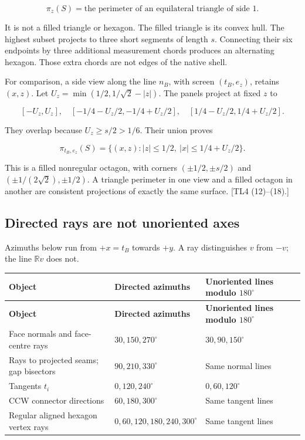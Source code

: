 \documentclass[11pt,a4paper]{article}
\begin{document}
\[
\pi_z(S)=\text{the perimeter of an equilateral triangle of side 1}.
\tag{M12}\label{eq:M12}
\]

It is not a filled triangle or hexagon. The filled triangle is its convex hull. The highest subset projects to three short segments of length \(s\). Connecting their six endpoints by three additional measurement chords produces an alternating hexagon. Those extra chords are not edges of the native shell.

For comparison, a side view along the line \(n_B\), with screen \((t_B,e_z)\), retains \((x,z)\). Let \(U_z=\min(1/2,1/\sqrt2-|z|)\). The panels project at fixed \(z\) to

\[
[-U_z,U_z],\quad[-1/4-U_z/2,-1/4+U_z/2],\quad
[1/4-U_z/2,1/4+U_z/2].
\]

They overlap because \(U_z\ge s/2>1/6\). Their union proves

\[
\pi_{t_B,e_z}(S)=\{(x,z):|z|\le1/2,\ |x|\le1/4+U_z/2\}.
\tag{M13}\label{eq:M13}
\]

This is a filled nonregular octagon, with corners \((\pm1/2,\pm s/2)\) and \((\pm1/(2\sqrt2),\pm1/2)\). A triangle perimeter in one view and a filled octagon in another are consistent projections of exactly the same surface. [TL4 (12)--(18).]

\subsection{Directed rays are not unoriented axes}

Azimuths below run from \(+x=t_B\) towards \(+y\). A ray distinguishes \(v\) from \(-v\); the line \(\mathbb Rv\) does not.

\begingroup\small\setlength{\LTpre}{5pt}\setlength{\LTpost}{7pt}
\begin{longtable}{@{}>{\raggedright\arraybackslash}p{0.2500\dimexpr\textwidth-24pt\relax}>{\raggedright\arraybackslash}p{0.3700\dimexpr\textwidth-24pt\relax}>{\raggedright\arraybackslash}p{0.3800\dimexpr\textwidth-24pt\relax}@{}}
\toprule
\textbf{Object} & \textbf{Directed azimuths} & \textbf{Unoriented lines modulo \(180^\circ\)}\\ \midrule
\endfirsthead
\textbf{Object} & \textbf{Directed azimuths} & \textbf{Unoriented lines modulo \(180^\circ\)}\\ \midrule
\endhead
\bottomrule\endfoot
Face normals and face-centre rays & \(30,150,270^\circ\) & \(30,90,150^\circ\)\\[4pt]
Rays to projected seams; gap bisectors & \(90,210,330^\circ\) & Same normal lines\\[4pt]
Tangents \(t_i\) & \(0,120,240^\circ\) & \(0,60,120^\circ\)\\[4pt]
CCW connector directions & \(60,180,300^\circ\) & Same tangent lines\\[4pt]
Regular aligned hexagon vertex rays & \(0,60,120,180,240,300^\circ\) & Same tangent lines\\[4pt]
\end{longtable}\endgroup
\end{document}
